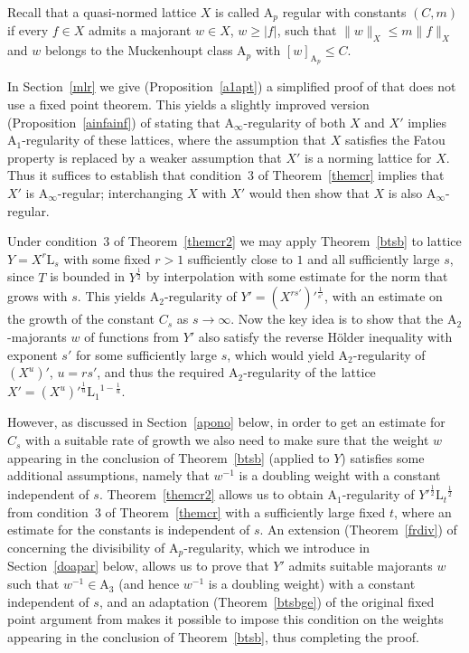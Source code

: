 \documentclass[12pt]{amsart}
\newcommand {\apclass} [1] {\ensuremath{\mathrm A_{#1}}}
\newcommand {\lclassg} [1] {\ensuremath{\mathrm L_{#1}}}
\newcommand {\weightw} {\ensuremath {\mathit w}}
\begin{document}
Recall that a quasi-normed lattice $X$ is called $\apclass {p}$ regular with constants $(C, m)$ if
every $f \in X$ admits a majorant $\weightw \in X$, $\weightw \geqslant |f|$, such that $\|\weightw\|_X \leqslant m \|f\|_X$
and
$\weightw$ belongs to the Muckenhoupt class $\apclass {p}$ with $[\weightw]_{\apclass {p}} \leqslant C$.

In Section~\ref {mlr}
we give (Proposition~\ref {a1apt}) a simplified proof of \cite [Proposition~8] {rutsky2014sm}
that does not use a fixed point theorem.
This yields a slightly improved version (Proposition~\ref {ainfainf}) of \cite [Proposition~12] {rutsky2014sm}
stating that
$\apclass {\infty}$-regularity of both $X$ and $X'$ implies
$\apclass {1}$-regularity of these lattices, where the assumption that $X$ satisfies the Fatou property is replaced
by a weaker assumption that $X'$ is a norming lattice for $X$.  Thus it suffices to establish
that condition~3 of Theorem~\ref {themcr} implies that $X'$ is $\apclass {\infty}$-regular;
interchanging $X$ with $X'$ would then show that $X$ is also $\apclass {\infty}$-regular.

Under condition~3 of Theorem~\ref {themcr2} we may apply Theorem~\ref {btsb} to lattice $Y = X^r \lclassg {s}$
with some fixed $r > 1$ sufficiently close to $1$ and all sufficiently large $s$, since $T$ is bounded in $Y^{\frac 1 2}$
by interpolation with some estimate for the norm that grows with $s$.
This yields $\apclass {2}$-regularity of $Y' = (X^{rs'})'^{\frac 1 {s'}}$, with an estimate on the growth of the constant
$C_s$
as $s \to \infty$.
Now the key idea is to show that the $\apclass {2}$-majorants $\weightw$ of functions from $Y'$ also satisfy the reverse
H\"older inequality with exponent $s'$ for some sufficiently large $s$,
which would yield $\apclass {2}$-regularity of $(X^u)'$, $u = r s'$,
and thus the required $\apclass {2}$-regularity of the lattice $X' = (X^u)'^{\frac 1 u} \lclassg {1}^{1 - \frac 1 u}$.

However, as discussed in Section~\ref {apono} below, in order 
to get an estimate for $C_s$ with a suitable rate of growth we also need to make sure that the weight $\weightw$
appearing in the conclusion of Theorem~\ref {btsb} (applied to $Y$) satisfies some additional assumptions, namely that
$\weightw^{-1}$
is a doubling weight with a constant independent of $s$.
Theorem~\ref {themcr2} allows us to obtain $\apclass {1}$-regularity
of $Y'^{\frac 1 2} \lclassg {t}^{\frac 1 2}$ from condition~3 of Theorem~\ref {themcr}
with a sufficiently large fixed $t$, where an estimate for the constants is independent of $s$.
An extension (Theorem~\ref {frdiv})
of \cite [Theorem~2] {rutsky2011en} concerning the divisibility of $\apclass {p}$-regularity,
which we introduce in Section~\ref {doapar} below,
allows us to prove that $Y'$ admits suitable majorants
$\weightw$ such that $\weightw^{-1} \in \apclass {3}$ 
(and hence $\weightw^{-1}$ is a doubling weight) with a constant independent of $s$,
and an adaptation (Theorem~\ref {btsbge}) of the original
fixed point argument from \cite [\S 2] {rutsky2014sm} makes it possible to impose this condition on the weights appearing in
the conclusion of Theorem~\ref {btsb}, thus completing the proof.
\end{document}
